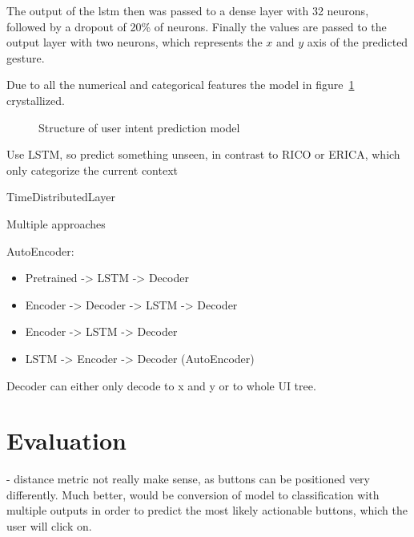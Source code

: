 The output of the \gls{lstm} then was passed to a dense layer with 32 neurons, followed by a dropout of 20\% of neurons.
Finally the values are passed to the output layer with two neurons, which represents the $x$ and $y$ axis of the predicted gesture.

Due to all the numerical and categorical features the model in figure~\ref{fig:model_structure} crystallized.


\begin{figure}[htbp!]
  \centering
  
  \caption[Structure of user intent prediction model]{Structure of user intent prediction model}
  \label{fig:model_structure}
\end{figure}

Use LSTM, so predict something unseen, in contrast to RICO or ERICA, which only categorize the current context

TimeDistributedLayer


Multiple approaches


AutoEncoder:

\begin{itemize}
  \item Pretrained -> LSTM -> Decoder
  \item Encoder -> Decoder -> LSTM -> Decoder
  \item Encoder -> LSTM -> Decoder
  \item LSTM -> Encoder -> Decoder (AutoEncoder)
\end{itemize}

Decoder can either only decode to x and y or to whole UI tree.

\section{Evaluation}

- distance metric not really make sense, as buttons can be positioned very differently.
Much better, would be conversion of model to classification with multiple outputs in order to predict the most likely actionable buttons, which the user will click on.

